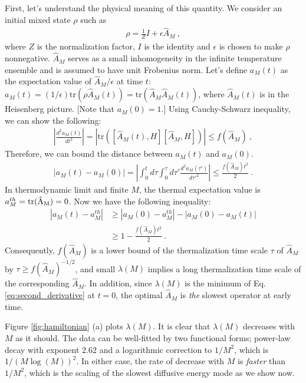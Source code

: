 \documentclass[twocolumn,superscriptaddress, prl,showpacs]{revtex4-1}
\begin{document}
First, let's understand the physical meaning of this quantity.
We consider an initial mixed state $\rho$ such as
\begin{align}\label{eq:initial}
\rho = \frac{1}{Z}I + \epsilon\hat{A}_M ~,
\end{align}
where $Z$ is the normalization factor, $I$ is the identity and $\epsilon$ is chosen to make $\rho$ nonnegative.
$\hat{A}_M$ serves as a small inhomogeneity in the infinite temperature ensemble and
is assumed to have unit Frobenius norm.
Let's define $a_M(t)$ as the expectation value of $\hat{A}_M/\epsilon$ at time $t$:
$a_M(t) = (1/\epsilon)\mathrm{tr}(\rho \hat{A}_M(t)) = \mathrm{tr}(\hat{A}_M \hat{A}_M(t))$,
where $\hat{A}_M(t)$ is in the Heisenberg picture. [Note that $a_M(0) = 1$.]
Using Cauchy-Schwarz inequality, we can show the following:
\begin{align}
\left|\frac{d^2 a_M(t)}{dt^2}\right| = |\mathrm{tr}([\hat{A}_M(t),H][\hat{A}_M,H])| \leq f(\hat{A}_M) ~,
\label{eq:second_derivative}
\end{align}
Therefore, we can bound the distance between $a_M(t)$ and $a_M(0)$.
\begin{align}
|a_M(t) - a_M(0)| = \left|\int^t_0 d\tau \int^\tau_0 d\tau' \frac{d^2 a_M(\tau')}{d\tau'^2}\right| \leq \frac{f(\hat{A}_M) t^2}{2} ~.
\end{align}
In thermodynamic limit and finite $M$, the thermal expectation value is
$a_M^{th} = \rm{tr}(\hat{A}_M) = 0$.
Now we have the following inequality:
\begin{align}
|a_M(t) - a_M^{th}| &\geq |a_M(0) - a_M^{th}| - |a_M(0) - a_M(t)| \nonumber\\
& \geq 1 - \frac{f(\hat{A}_M)t^2}{2} ~.
\label{eq:hamiltonian_timescale}
\end{align}
Consequently, $f(\hat{A}_M)$ is a lower bound of the thermalization time scale $\tau$ of $\hat{A}_M$ by $\tau \geq f(\hat{A}_M)^{-1/2}$,
and small $\lambda(M)$ implies a long thermalization time scale of the corresponding $\hat{A}_M$.
In addition, since $\lambda(M)$ is the minimum of Eq. \eqref{eq:second_derivative} at $t =0$,
the optimal $\hat{A}_M$ is {\it the} slowest operator at early time.


Figure \ref{fig:hamiltonian} (a) plots $\lambda (M)$.
It is clear that $\lambda(M)$ decreases with $M$ as it should.
The data can be well-fitted by two functional forms; power-law decay with exponent $2.62$ and a logarithmic correction to $1/M^2$, which is $1/(M\log(M))^2$.
In either case, the rate of decrease with $M$ is {\it faster} than $1/M^2$, which is the scaling of the slowest diffusive energy mode as we show now.
\end{document}
